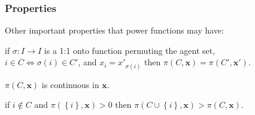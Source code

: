 \documentclass{beamer}
\makeatletter
\def\mcolor#1#2{\rule{0ex}{0ex}\color{#1}#2\color{black}{}}
\newcommand{\IffDef}{:\Leftrightarrow}
\def\Quant#1#2{\begin{array}[t]{@{}c@{}}#1 \\[-1ex] \scriptstyle #2 \end{array}\;}
\def\QuantCond#1#2#3{\begin{array}[t]{@{}c@{}}#1 \\[-1ex] \scriptstyle #2 \\[-1ex]\scriptstyle #3 \end{array}\;}
\def\ForAll#1{\Quant{\forall}{#1}}
\def\ForAllCond#1#2{\QuantCond{\forall}{#1}{#2}}
\newcommand{\NN}{\mathbb{N}}
\newenvironment{flist}{\begin{array}{@{}ll@{}}}{\end{array}}
\newenvironment{Envanybound}[4]{\vspace{0.3ex}\par\noindent \textbf{#1}[``#2'', any[$#3$], %
  bound[$#4$], \\[0.5ex]\makebox[5mm]{}
  \begin{math}\begin{flist}}{\end{flist}]%
  \end{math}\vspace{0.3ex}\rmfamily}
\makeatother
\begin{document}





\begin{frame}
\frametitle{Properties}
Other important properties that power functions may have:
\begin{description}[AN]
  \item[\mcolor{red}{AN}]\quad if $\sigma: I \rightarrow I$ is a 1:1 onto function permuting the agent set,\\\quad $i \in C \Leftrightarrow \sigma \left( i \right) \in C'$, and $x_i = x'_{\sigma \left( i \right)}$ then $\pi \left( C, \bm{x} \right) = \pi \left( C', \bm{x}' \right)$.
  \item[\mcolor{red}{CX}]\quad $\pi \left( C, \bm{x} \right)$ is continuous in $\bm{x}$.
  \item[\mcolor{red}{RE}]\quad if $i \notin C$ and $\pi \left( \left\{ i \right\}, \bm{x} \right) > 0$ then $\pi \left( C \cup \left\{ i \right\}, \bm{x} \right) > \pi \left( C, \bm{x} \right)$.
\end{description}
\end{frame}
\end{document}
